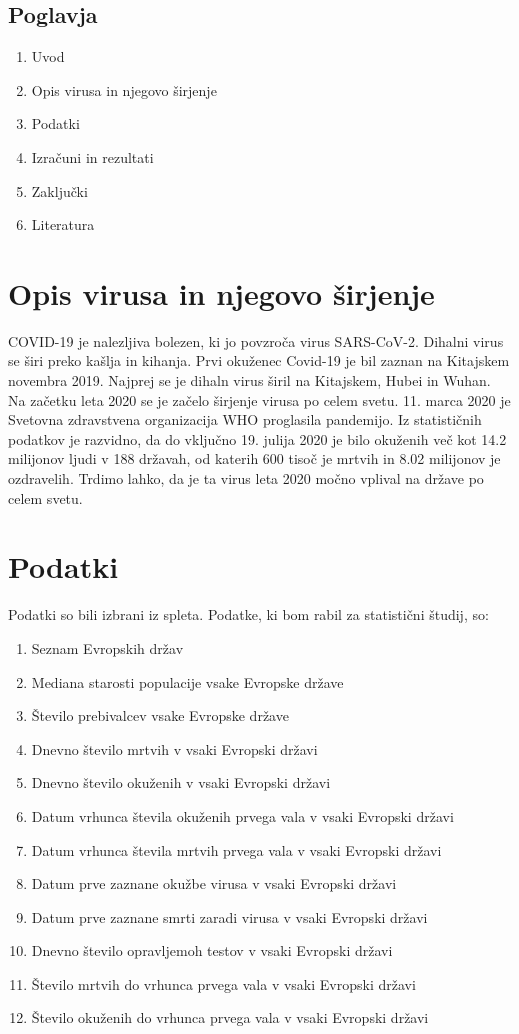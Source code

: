 \documentclass[a4paper,11pt]{article}
\begin{document}
\subsection{Poglavja}
\begin{enumerate}
\item{Uvod}
\item{Opis virusa in njegovo širjenje}
\item{Podatki}
\item{Izračuni in rezultati}
\item{Zaključki}
\item{Literatura}
\end{enumerate}

\section{Opis virusa in njegovo širjenje}
COVID-19 je nalezljiva bolezen, ki jo povzroča virus SARS-CoV-2. Dihalni virus se širi preko kašlja in kihanja. Prvi okuženec Covid-19 je bil zaznan na Kitajskem novembra 2019. Najprej se je dihaln virus širil na Kitajskem, Hubei in Wuhan. Na začetku leta 2020 se je začelo širjenje virusa po celem svetu. 11. marca 2020 je Svetovna zdravstvena organizacija WHO proglasila pandemijo. Iz statističnih podatkov je razvidno, da do vključno 19. julija 2020 je bilo okuženih več kot 14.2 milijonov ljudi v 188 državah, od katerih 600 tisoč je mrtvih in 8.02 milijonov je ozdravelih. Trdimo lahko, da je ta virus leta 2020 močno vplival na države po celem svetu.
\section{Podatki}
Podatki so bili izbrani iz spleta. Podatke, ki bom rabil za statistični študij, so:
\begin{enumerate}
\item{Seznam Evropskih držav}
\item{Mediana starosti populacije vsake Evropske države}
\item{Število prebivalcev vsake Evropske države}
\item{Dnevno število mrtvih v vsaki Evropski državi}
\item{Dnevno število okuženih v vsaki Evropski državi}
\item{Datum vrhunca števila okuženih prvega vala v vsaki Evropski državi}
\item{Datum vrhunca števila mrtvih prvega vala v vsaki Evropski državi}
\item{Datum prve zaznane okužbe virusa v vsaki Evropski državi}
\item{Datum prve zaznane smrti zaradi virusa v vsaki Evropski državi}
\item{Dnevno število opravljemoh testov v vsaki Evropski državi}
\item{Število mrtvih do vrhunca prvega vala v vsaki Evropski državi}
\item{Število okuženih do vrhunca prvega vala v vsaki Evropski državi}
\end{enumerate}
\end{document}
